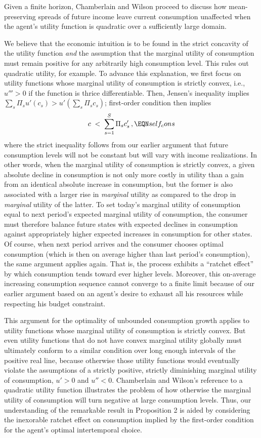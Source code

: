 \noindent
Given a finite horizon, Chamberlain and Wilson proceed to discuss
how mean-preserving spreads of future income leave current consumption
unaffected when the agent's utility function is quadratic over a
sufficiently large domain.


We believe that the economic intuition is to be found in the strict
concavity of the utility function {\it and} the assumption that the marginal
utility of consumption must remain positive for any arbitrarily high
consumption level. This rules out quadratic utility,
for example.  To advance this explanation, we first focus on
utility functions whose marginal utility of consumption is
strictly convex, i.e., $u'''>0$ if the function is thrice differentiable.
Then, Jensen's
inequality implies $\sum_s \Pi_s u'(c_s) >u'( \sum_s \Pi_s c_s)$;
first-order condition  then implies
$$
c \;<\; \sum_{s=1}^S  \Pi_s c^\prime_s\,,          \EQN self_cons
$$
where the strict inequality follows from our earlier argument
that future consumption levels will not be constant but will
vary with income realizations.
In other words, when the marginal utility of consumption is strictly
convex, a given absolute
decline in consumption is not only more costly in utility than a
gain from an identical absolute increase in consumption, but the former
is also associated with a larger rise in {\it marginal\/} utility as compared
to the drop in {\it marginal\/} utility of the latter.
To set
today's marginal utility of consumption equal to next period's
expected marginal utility of consumption, the consumer
must therefore balance future states with expected declines in
consumption against  appropriately
higher expected increases in consumption
for other states. Of course, when next period arrives  and the
consumer chooses optimal consumption
(which is then on average higher than
last period's consumption), the same argument applies again.
That is, the process exhibits a ``ratchet effect'' by which consumption
tends toward ever higher levels. Moreover, this on-average increasing
consumption sequence cannot converge to a finite limit because of
our earlier argument based on an agent's desire to exhaust all
his resources while respecting his budget constraint.

 This argument for the optimality of unbounded consumption growth
applies to utility functions whose marginal utility of consumption is
strictly convex. But even utility functions that do not have convex marginal
utility globally  must ultimately conform to a similar condition over
long enough intervals of the positive real line, because otherwise
those utility functions would eventually violate the assumptions of a
strictly positive, strictly diminishing marginal utility
of consumption, $u'>0$ and $u''<0$. Chamberlain and Wilson's
reference to a quadratic utility function illustrates the problem
of how otherwise the marginal utility of consumption will  turn negative
at large consumption levels. Thus,
our understanding of the remarkable result in Proposition 2 is
aided by considering the inexorable ratchet effect on consumption
implied by the first-order condition for the agent's
optimal intertemporal choice.



